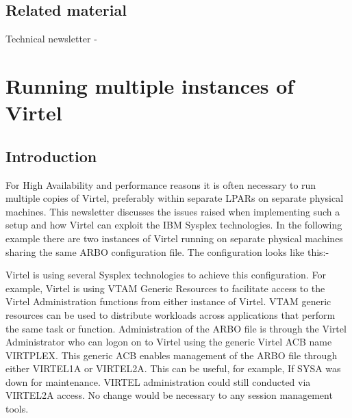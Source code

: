 \documentclass[letterpaper,10pt,english]{sphinxmanual}
\begin{document}
\newpage


\section{Related material}
\label{\detokenize{connectivity_guide:index-168}}\label{\detokenize{connectivity_guide:related-material}}
Technical newsletter - 


\chapter{Running multiple instances of Virtel}
\label{\detokenize{connectivity_guide:index-169}}\label{\detokenize{connectivity_guide:running-multiple-instances-of-virtel}}

\section{Introduction}
\label{\detokenize{connectivity_guide:id75}}
For High Availability and performance reasons it is often necessary to run multiple copies of Virtel, preferably within separate LPARs on separate physical machines. This newsletter discusses the issues raised when implementing such a setup and how Virtel can exploit the IBM Sysplex technologies. In the following example there are two instances of Virtel running on separate physical machines sharing the same ARBO configuration file. The configuration looks like this:-


Virtel is using several Sysplex technologies to achieve this configuration. For example, Virtel is using VTAM Generic Resources to facilitate access to the Virtel Administration functions from either instance of Virtel. VTAM generic resources can be used to distribute workloads across applications that perform the same task or function. Administration of the ARBO file is through the Virtel Administrator who can logon on to Virtel using the generic Virtel ACB name VIRTPLEX. This generic ACB enables management of the ARBO file through either VIRTEL1A or VIRTEL2A. This can be useful, for example, If SYSA was down for maintenance. VIRTEL administration could still conducted via VIRTEL2A access. No change would be necessary to any session management tools.
\end{document}
